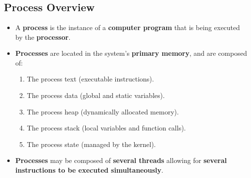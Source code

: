 \documentclass[16pt]{article}
\begin{document}
    \section*{}

    \subsection*{Process Overview}
    \begin{itemize}
        \item A \textbf{process} is the instance of a \textbf{computer program} that is being executed by the \textbf{processor}.
        \item \textbf{Processes} are located in the system's \textbf{primary memory}, and are composed of:
        \begin{enumerate}
            \item The process text (executable instructions).
            \item The process data (global and static variables).
            \item The process heap (dynamically allocated memory).
            \item The process stack (local variables and function calls).
            \item The process state (managed by the kernel).
        \end{enumerate}
        \item \textbf{Processes} may be composed of \textbf{several threads} allowing for \textbf{several instructions to be executed simultaneously}.
    \end{itemize}
\end{document}
